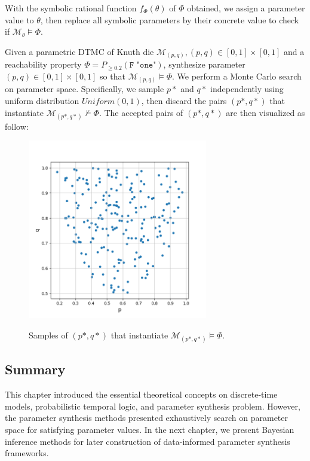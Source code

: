 With the symbolic rational function $f_\Phi(\theta)$ of $\Phi$ obtained, we assign a parameter value
to $\theta$, then replace all symbolic parameters by their concrete value to check if
$\mathcal{M}_\theta \models \Phi$.
\begin{example}
      Given a parametric DTMC of Knuth die $\mathcal{M}_{(p,q)}, (p,q)\in[0,1]\times[0,1]$ and a
      reachability property $\Phi = P_{\geq 0.2} (\texttt{F "one"})$, synthesize parameter
      $(p,q)\in[0,1]\times[0,1]$ so that $\mathcal{M}_{(p,q)} \models \Phi$. We perform a Monte
      Carlo search on parameter space. Specifically, we sample $p*$ and $q*$ independently using
      uniform distribution $Uniform(0,1)$, then discard the pairs $(p*,q*)$ that instantiate
      $\mathcal{M}_{(p*,q*)}\nvDash \Phi$. The accepted pairs of $(p*,q*)$ are then visualized as
      follow:
      \begin{figure}[H]
            \centering
            \includegraphics[width=0.7\textwidth]{figures/knuth_die_trueparams.png}
            \label{fig:knuth-die-pq-trueparams}
            \caption{Samples of $(p*,q*)$ that instantiate $\mathcal{M}_{(p*,q*)} \models \Phi$.}
      \end{figure}
\end{example}

\subsection{Summary}
This chapter introduced the essential theoretical concepts on discrete-time models, probabilistic
temporal logic, and parameter synthesis problem. However, the parameter synthesis methods presented
exhaustively search on parameter space for satisfying parameter values. In the next chapter, we
present Bayesian inference methods for later construction of data-informed parameter synthesis
frameworks.